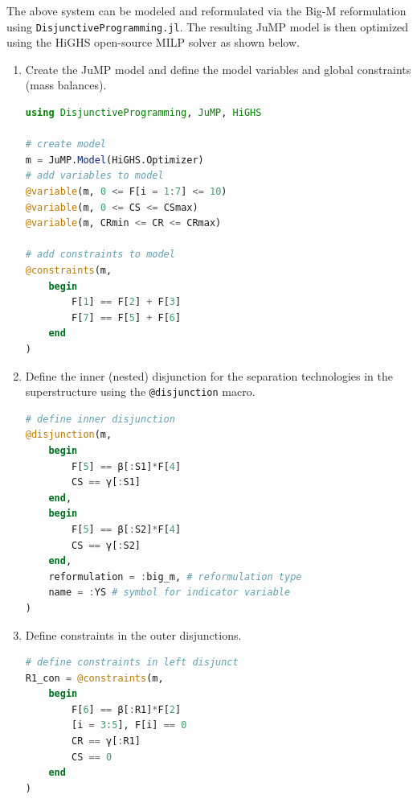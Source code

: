 \documentclass{juliacon}
\begin{document}
The above system can be modeled and reformulated via the Big-M reformulation using \verb|DisjunctiveProgramming.jl|. The resulting JuMP model is then optimized using the HiGHS open-source MILP solver \cite{huangfu2018parallelizing} as shown below.

\begin{enumerate}
    \item Create the JuMP model and define the model variables and global constraints (mass balances).
\begin{lstlisting}[language = Julia]
using DisjunctiveProgramming, JuMP, HiGHS

# create model
m = JuMP.Model(HiGHS.Optimizer)
# add variables to model
@variable(m, 0 <= F[i = 1:7] <= 10)
@variable(m, 0 <= CS <= CSmax)
@variable(m, CRmin <= CR <= CRmax)

# add constraints to model
@constraints(m,
    begin
        F[1] == F[2] + F[3]
        F[7] == F[5] + F[6]
    end
)
\end{lstlisting}
    \item Define the inner (nested) disjunction for the separation technologies in the superstructure using the \verb|@disjunction| macro.   
\begin{lstlisting}[language = Julia]
# define inner disjunction
@disjunction(m,
    begin
        F[5] == β[:S1]*F[4]
        CS == γ[:S1]
    end,
    begin
        F[5] == β[:S2]*F[4]
        CS == γ[:S2]
    end,
    reformulation = :big_m, # reformulation type
    name = :YS # symbol for indicator variable
)
\end{lstlisting}
    \item Define constraints in the outer disjunctions.
\begin{lstlisting}[language = Julia]
# define constraints in left disjunct
R1_con = @constraints(m,
    begin
        F[6] == β[:R1]*F[2]
        [i = 3:5], F[i] == 0
        CR == γ[:R1]
        CS == 0
    end
)


\end{lstlisting}
\end{enumerate}
\end{document}
